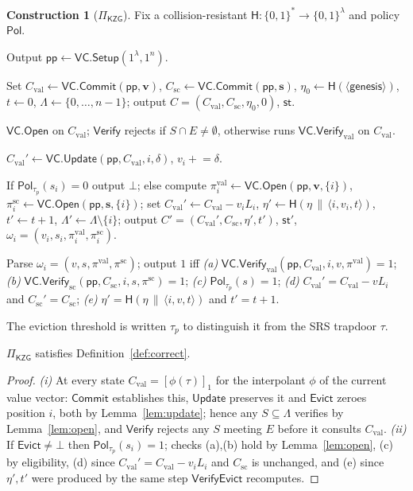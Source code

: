 \documentclass[version=preprint]{iacrcc}
\theoremstyle{definition}
\newtheorem{construction}{Construction}[section]
\newcommand{\secpar}{\lambda}
\newcommand{\bit}{\{0,1\}}
\newcommand{\concat}{\,\|\,}
\newcommand{\Setup}{\mathsf{Setup}}
\newcommand{\Commit}{\mathsf{Commit}}
\newcommand{\Open}{\mathsf{Open}}
\newcommand{\Vfy}{\mathsf{Verify}}
\newcommand{\Update}{\mathsf{Update}}
\newcommand{\Evict}{\mathsf{Evict}}
\newcommand{\VfyEvict}{\mathsf{VerifyEvict}}
\newcommand{\pp}{\mathsf{pp}}
\newcommand{\aux}{\mathsf{st}}
\newcommand{\Pol}{\mathsf{Pol}}
\newcommand{\Val}{\mathrm{val}}
\newcommand{\Sc}{\mathrm{sc}}
\newcommand{\Cval}{C_{\Val}}
\newcommand{\Csc}{C_{\Sc}}
\newcommand{\Live}{\Lambda}
\newcommand{\Evicted}{E}
\newcommand{\hash}{\mathsf{H}}
\newcommand{\VC}{\mathsf{VC}}
\newcommand{\gone}[1]{\left[#1\right]_{1}}
\begin{document}
\begin{construction}[$\Pi_{\mathsf{KZG}}$]\label{con:evictvc}
Fix a collision-resistant $\hash:\bit^{*}\to\bit^{\secpar}$ and policy $\Pol$.
\begin{description}[leftmargin=0em,itemsep=4pt]
\item[$\Setup(1^\secpar,1^{n})$.] Output $\pp\leftarrow\VC.\Setup(1^\secpar,1^{n})$.
\item[$\Commit(\pp,\mathbf{v},\mathbf{s})$.] Set
      $\Cval\leftarrow\VC.\Commit(\pp,\mathbf{v})$,
      $\Csc\leftarrow\VC.\Commit(\pp,\mathbf{s})$,
      $\eta_0\leftarrow\hash(\langle\textsf{genesis}\rangle)$, $t\leftarrow0$,
      $\Live\leftarrow\{0,\dots,n-1\}$; output $C=(\Cval,\Csc,\eta_0,0)$, $\aux$.
\item[$\Open/\Vfy$.] $\VC.\Open$ on $\Cval$; $\Vfy$ rejects if
      $S\cap\Evicted\neq\emptyset$, otherwise runs $\VC.\Vfy_{\Val}$ on $\Cval$.
\item[$\Update(\pp,\aux,i,\delta)$.]
      $\Cval'\leftarrow\VC.\Update(\pp,\Cval,i,\delta)$, $v_i\mathrel{+}=\delta$.
\item[$\Evict(\pp,\aux,i,\tau_{\!p})$.] If $\Pol_{\tau_{\!p}}(s_i)=0$ output
      $\bot$; else compute $\pi_i^{\Val}\leftarrow\VC.\Open(\pp,\mathbf{v},\{i\})$,
      $\pi_i^{\Sc}\leftarrow\VC.\Open(\pp,\mathbf{s},\{i\})$; set
      $\Cval'\leftarrow\Cval-v_i L_i$,
      $\eta'\leftarrow\hash(\eta\concat\langle i,v_i,t\rangle)$, $t'\leftarrow t+1$,
      $\Live'\leftarrow\Live\setminus\{i\}$; output $C'=(\Cval',\Csc,\eta',t')$,
      $\aux'$, $\omega_i=(v_i,s_i,\pi_i^{\Val},\pi_i^{\Sc})$.
\item[$\VfyEvict(\pp,C,i,\tau_{\!p},\omega_i,C')$.] Parse
      $\omega_i=(v,s,\pi^{\Val},\pi^{\Sc})$; output $1$ iff
      \emph{(a)} $\VC.\Vfy_{\Val}(\pp,\Cval,i,v,\pi^{\Val})=1$;
      \emph{(b)} $\VC.\Vfy_{\Sc}(\pp,\Csc,i,s,\pi^{\Sc})=1$;
      \emph{(c)} $\Pol_{\tau_{\!p}}(s)=1$;
      \emph{(d)} $\Cval'=\Cval-v L_i$ and $\Csc'=\Csc$;
      \emph{(e)} $\eta'=\hash(\eta\concat\langle i,v,t\rangle)$ and $t'=t+1$.
\end{description}
\end{construction}

\noindent The eviction threshold is written $\tau_{\!p}$ to distinguish it from
the SRS trapdoor $\tau$.

\begin{theorem}[Correctness]\label{thm:correct}
$\Pi_{\mathsf{KZG}}$ satisfies Definition~\ref{def:correct}.
\end{theorem}
\begin{proof}
\emph{(i)} At every state $\Cval=\gone{\phi(\tau)}$ for the interpolant $\phi$ of
the current value vector: $\Commit$ establishes this, $\Update$ preserves it and
$\Evict$ zeroes position $i$, both by Lemma~\ref{lem:update}; hence any
$S\subseteq\Live$ verifies by Lemma~\ref{lem:open}, and $\Vfy$ rejects any $S$
meeting $\Evicted$ before it consults $\Cval$. \emph{(ii)} If
$\Evict\neq\bot$ then $\Pol_{\tau_{\!p}}(s_i)=1$; checks (a),(b) hold by
Lemma~\ref{lem:open}, (c) by eligibility, (d) since $\Cval'=\Cval-v_iL_i$ and
$\Csc$ is unchanged, and (e) since $\eta',t'$ were produced by the same step
$\VfyEvict$ recomputes.
\end{proof}
\end{document}
